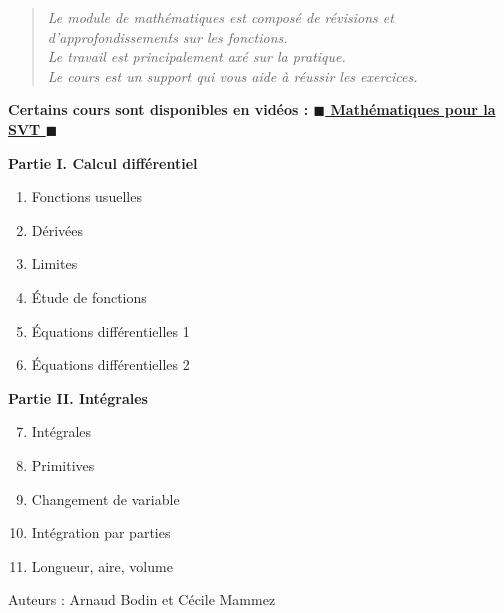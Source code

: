 \documentclass[11pt,a4paper]{report}
\begin{document}



\bigskip


\begin{quote}
\center
\emph{Le module de mathématiques est composé de révisions et d'approfondissements sur les fonctions. \\
Le travail est principalement axé sur la pratique. \\
Le cours est un support qui vous aide à réussir les exercices.}
\end{quote}

\bigskip
\bigskip
\bigskip
\bigskip


{\large\bf
Certains cours sont disponibles en vidéos : 
\href{https://www.youtube.com/channel/UCTeAx64qLOxULLcjUl9qfZg}{$\blacksquare$ Mathématiques pour la SVT $\blacksquare$}}

\bigskip
\bigskip
\bigskip
\bigskip

\textbf{Partie I.  Calcul différentiel}
\begin{enumerate}[label=\arabic*.]
  \item Fonctions usuelles
  \item Dérivées
  \item Limites
  \item \'Etude de fonctions
  \item \'Equations différentielles 1
  \item \'Equations différentielles 2
\end{enumerate}

\bigskip

\textbf{Partie II.  Intégrales}
\begin{enumerate}[label=\arabic*.]
\setcounter{enumi}{6}
  \item Intégrales
  \item Primitives
  \item Changement de variable
  \item Intégration par parties
  \item Longueur, aire, volume
\end{enumerate}

\vfill

Auteurs : Arnaud Bodin  et Cécile Mammez
\end{document}
